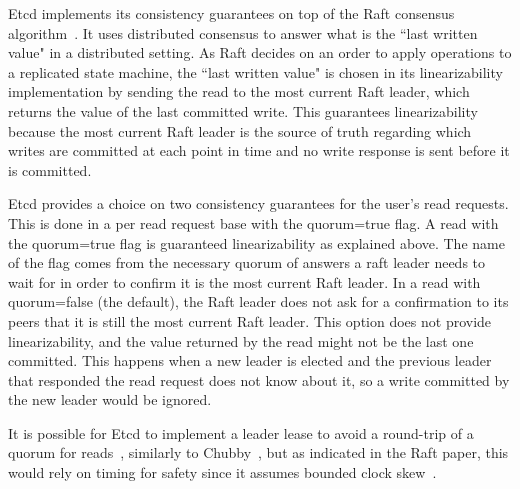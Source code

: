 \documentclass[12pt,conference]{IEEEtran}
\begin{document}
Etcd implements its consistency guarantees on top of the Raft consensus algorithm~\cite{ongaro2014search,etcdGithubWebsite}. It uses distributed consensus to answer what is the “last written value" in a distributed setting. As Raft decides on an order to apply operations to a replicated state machine, the “last written value" is chosen in its linearizability implementation by sending the read to the most current Raft leader, which returns the value of the last committed write. This guarantees linearizability because the most current Raft leader is the source of truth regarding which writes are committed at each point in time and no write response is sent before it is committed. 

Etcd provides a choice on two consistency guarantees for the user’s read requests. This is done in a per read request base with the quorum=true flag. A read with the quorum=true flag is guaranteed linearizability as explained above. The name of the flag comes from the necessary quorum of answers a raft leader needs to wait for in order to confirm it is the most current Raft leader. In a read with quorum=false (the default), the Raft leader does not ask for a confirmation to its peers that it is still the most current Raft leader. This option does not provide linearizability, and the value returned by the read might not be the last one committed. This happens when a new leader is elected and the previous leader that responded the read request does not know about it, so a write committed by the new leader would be ignored. 

It is possible for Etcd to implement a leader lease to avoid a round-trip of a quorum for reads~\cite{gray1989leases}, similarly to Chubby~\cite{burrows2006chubby}, but as indicated in the Raft paper, this would rely on timing for safety since it assumes bounded clock skew~\cite{ongaro2014search}.




%
%
\end{document}
